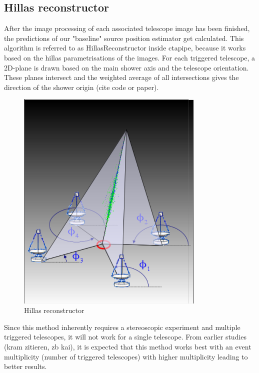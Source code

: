 \subsection{Hillas reconstructor}  %
After the image processing of each associated telescope image has been finished,
the predictions of our "baseline" source position estimator get calculated.
This algorithm is referred to as HillasReconstructor inside ctapipe, because 
it works based on the hillas parametrisations of the images.
For each triggered telescope, a 2D-plane is drawn based on the main shower 
axis and the telescope orientation. These planes intersect and 
the weighted average of all intersections gives the 
direction of the shower origin (cite code or paper).

\begin{figure}
	\centering
	\includegraphics[width=0.8\textwidth]{images/hillas_reco.png}
	\caption{Hillas reconstructor}
	\label{fig:hillas_reconstructor}
\end{figure}

Since this method inherently requires a stereoscopic experiment
and multiple triggered telescopes, it will not work for a single telescope.
From earlier studies (kram zitieren, zb kai), it is expected
that this method works best with an event multiplicity 
(number of triggered telescopes)  with higher multiplicity
leading to better results.

